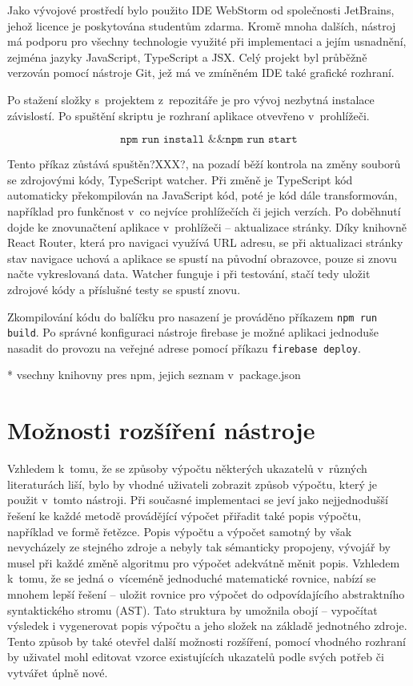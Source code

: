 Jako vývojové prostředí bylo použito IDE WebStorm od společnosti JetBrains, jehož licence je poskytována studentům zdarma. Kromě mnoha dalších, nástroj má podporu pro všechny technologie využité při implementaci a jejím usnadnění, zejména jazyky JavaScript, TypeScript a JSX. Celý projekt byl průběžně verzován pomocí nástroje Git, jež má ve zmíněném IDE také grafické rozhraní.

Po stažení složky s~projektem z~repozitáře je pro vývoj nezbytná instalace závislostí. Po spuštění skriptu je rozhraní aplikace otvevřeno v~prohlížeči.

$$\texttt{npm run install \&\& npm run start}$$

Tento příkaz zůstává spuštěn?XXX?, na pozadí běží kontrola na změny souborů se zdrojovými kódy, TypeScript watcher. Při změně je TypeScript kód automaticky překompilován na JavaScript kód, poté je kód dále transformován, například pro funkčnost v~co nejvíce prohlížečích či jejich verzích. Po doběhnutí dojde ke znovunačtení aplikace v~prohlížeči -- aktualizace stránky. Díky knihovně React Router, která pro navigaci využívá URL adresu, se při aktualizaci stránky stav navigace uchová a aplikace se spustí na původní obrazovce, pouze si znovu načte vykreslovaná data. Watcher funguje i při testování, stačí tedy uložit zdrojové kódy a příslušné testy se spustí znovu.

Zkompilování kódu do balíčku pro nasazení je prováděno příkazem \texttt{npm run build}. Po správné konfiguraci nástroje firebase je možné aplikaci jednoduše nasadit do provozu na veřejné adrese pomocí příkazu \texttt{firebase deploy}.



* vsechny knihovny pres npm, jejich seznam v~package.json


\section{Možnosti rozšíření nástroje}

Vzhledem k~tomu, že se způsoby výpočtu některých ukazatelů v~různých literaturách liší, bylo by vhodné uživateli zobrazit způsob výpočtu, který je použit v~tomto nástroji. Při současné implementaci se jeví jako nejjednodušší řešení ke každé metodě provádějící výpočet přiřadit také popis výpočtu, například ve formě řetězce. Popis výpočtu a výpočet samotný by však nevycházely ze stejného zdroje a nebyly tak sémanticky propojeny, vývojář by musel při každé změně algoritmu pro výpočet adekvátně měnit popis. Vzhledem k~tomu, že se jedná o~víceméně jednoduché matematické rovnice, nabízí se mnohem lepší řešení -- uložit rovnice pro výpočet do odpovídajícího abstraktního syntaktického stromu (AST). Tato struktura by umožnila obojí -- vypočítat výsledek i vygenerovat popis výpočtu a jeho složek na základě jednotného zdroje. Tento způsob by také otevřel další možnosti rozšíření, pomocí vhodného rozhraní by uživatel mohl editovat vzorce existujících ukazatelů podle svých potřeb či vytvářet úplně nové.

